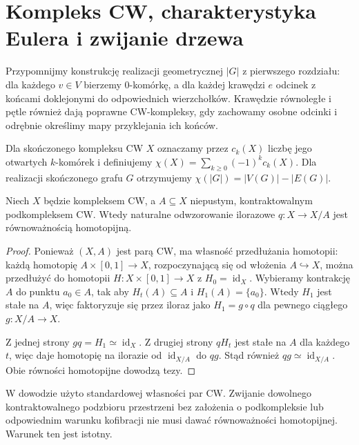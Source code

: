 \section{Kompleks CW, charakterystyka Eulera i zwijanie drzewa}
\label{sec:tg-collapse-tree}

Przypomnijmy konstrukcję realizacji geometrycznej $|G|$
z pierwszego rozdziału: dla każdego $v\in V$ bierzemy
$0$-komórkę, a dla każdej krawędzi $e$ odcinek z końcami
doklejonymi do odpowiednich wierzchołków. Krawędzie
równoległe i pętle również dają poprawne CW-kompleksy,
gdy zachowamy osobne odcinki i odrębnie określimy mapy
przyklejania ich końców.

\begin{definicja}
Dla skończonego kompleksu CW $X$ oznaczamy przez $c_k(X)$
liczbę jego otwartych $k$-komórek i definiujemy
$\chi(X)=\sum_{k\ge0}(-1)^k c_k(X)$.
Dla realizacji skończonego grafu $G$ otrzymujemy
$\chi(|G|)=|V(G)|-|E(G)|$.
\end{definicja}

\begin{lemat}
\label{lem:tg-collapse-CW}
Niech $X$ będzie kompleksem CW, a $A\subseteq X$
niepustym, kontraktowalnym podkompleksem CW.
Wtedy naturalne odwzorowanie ilorazowe $q:X\to X/A$
jest równoważnością homotopijną.
\end{lemat}

\begin{proof}
Ponieważ $(X,A)$ jest parą CW, ma własność przedłużania
homotopii: każdą homotopię $A\times[0,1]\to X$,
rozpoczynającą się od włożenia $A\hookrightarrow X$,
można przedłużyć do homotopii $H:X\times[0,1]\to X$
z $H_0=\operatorname{id}_X$. Wybieramy kontrakcję
$A$ do punktu $a_0\in A$, tak aby $H_t(A)\subseteq A$
i $H_1(A)=\{a_0\}$. Wtedy $H_1$ jest stałe na $A$,
więc faktoryzuje się przez iloraz jako $H_1=g\circ q$
dla pewnego ciągłego $g:X/A\to X$.

Z jednej strony $gq=H_1\simeq\operatorname{id}_X$.
Z drugiej strony $qH_t$ jest stałe na $A$ dla każdego $t$,
więc daje homotopię na ilorazie od
$\operatorname{id}_{X/A}$ do $qg$.
Stąd również $qg\simeq\operatorname{id}_{X/A}$.
Obie równości homotopijne dowodzą tezy.
\end{proof}

\begin{uwaga}
W dowodzie użyto standardowej własności par CW.
Zwijanie dowolnego kontraktowalnego podzbioru przestrzeni
bez założenia o podkompleksie lub odpowiednim warunku
kofibracji nie musi dawać równoważności homotopijnej. Warunek ten jest istotny.
\end{uwaga}

